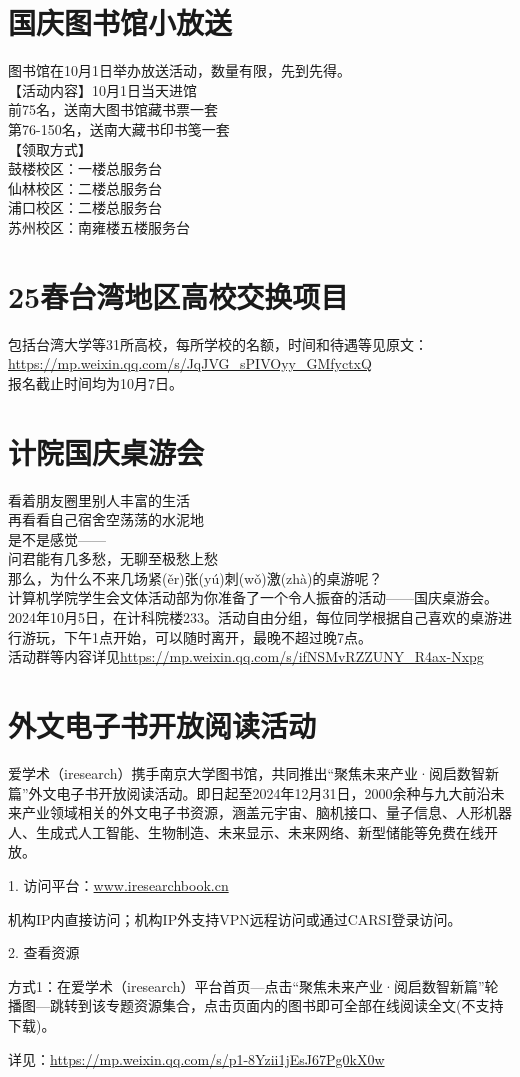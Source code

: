 \documentclass[letterpaper, 12pt]{article}
\begin{document}
\begin{multicols}{2}
\section{国庆图书馆小放送}
图书馆在10月1日举办放送活动，数量有限，先到先得。\\
【活动内容】10月1日当天进馆\\
前75名，送南大图书馆藏书票一套\\
第76-150名，送南大藏书印书笺一套\\
【领取方式】\\
鼓楼校区：一楼总服务台\\
仙林校区：二楼总服务台\\
浦口校区：二楼总服务台\\
苏州校区：南雍楼五楼服务台\\
\section{25春台湾地区高校交换项目}
包括台湾大学等31所高校，每所学校的名额，时间和待遇等见原文：\url{https://mp.weixin.qq.com/s/JqJVG_sPIVOyy_GMfyctxQ}\\
报名截止时间均为10月7日。
\section{计院国庆桌游会}
看着朋友圈里别人丰富的生活\\
再看看自己宿舍空荡荡的水泥地\\
是不是感觉——\\
问君能有几多愁，无聊至极愁上愁\\
那么，为什么不来几场紧(ěr)张(yú)刺(wǒ)激(zhà)的桌游呢？\\
计算机学院学生会文体活动部为你准备了一个令人振奋的活动——国庆桌游会。\\
2024年10月5日，在计科院楼233。活动自由分组，每位同学根据自己喜欢的桌游进行游玩，下午1点开始，可以随时离开，最晚不超过晚7点。\\
活动群等内容详见\url{https://mp.weixin.qq.com/s/ifNSMvRZZUNY_R4ax-Nxpg}
\section{外文电子书开放阅读活动}
爱学术（iresearch）携手南京大学图书馆，共同推出“聚焦未来产业·阅启数智新篇”外文电子书开放阅读活动。即日起至2024年12月31日，2000余种与九大前沿未来产业领域相关的外文电子书资源，涵盖元宇宙、脑机接口、量子信息、人形机器人、生成式人工智能、生物制造、未来显示、未来网络、新型储能等免费在线开放。

1. 访问平台：\url{www.iresearchbook.cn}

机构IP内直接访问；机构IP外支持VPN远程访问或通过CARSI登录访问。

2.  查看资源

方式1：在爱学术（iresearch）平台首页—点击“聚焦未来产业·阅启数智新篇”轮播图—跳转到该专题资源集合，点击页面内的图书即可全部在线阅读全文(不支持下载)。

详见：\url{https://mp.weixin.qq.com/s/p1-8Yzii1jEsJ67Pg0kX0w}
\end{multicols} 
\end{document}
